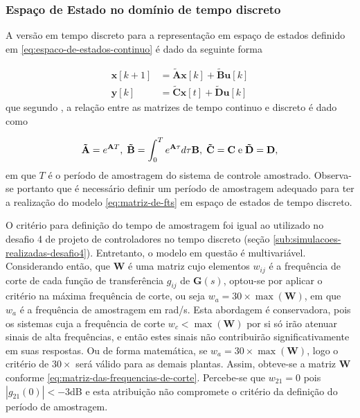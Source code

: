 \subsubsection{Espaço de Estado no domínio de tempo discreto}
\label{subsub:espaco-de-estados-no-dominio-de-tempo-discreto}

A versão em tempo discreto para a representação em espaço de estados definido em
\ref{eq:espaco-de-estados-continuo} é dado da seguinte forma

\begin{subequations}
    \label{eq:espaco-de-estados-discreto}
    \begin{align}
        \mathbf{x}[k+1] & = \mathbf{\tilde{A}}\mathbf{x}[k] + \mathbf{\tilde{B}}\mathbf{u}[k]
        \label{eq:estimativa-do-vetor-de-estados}                                             \\
        \mathbf{y}[k]   & = \mathbf{\tilde{C}}\mathbf{x}[t] + \mathbf{\tilde{D}}\mathbf{u}[k]
        \label{eq:saida-do-sistema-em-espaco-de-estados-discreto}
    \end{align}
\end{subequations} que segundo , a relação entre as
matrizes de tempo continuo e discreto é dado como

\begin{equation*}
    \mathbf{\tilde{A}} = e^{\mathbf{A}T},
    \thickspace
    \mathbf{\tilde{B}} = \int_{0}^{T}e^{\mathbf{A}\tau}d\tau \mathbf{B},
    \thickspace
    \mathbf{\tilde{C}} = \mathbf{C}
    \thickspace \text{e} \thickspace
    \mathbf{\tilde{D}} = \mathbf{D},
\end{equation*} em que $T$ é o período de amostragem do sistema de controle
amostrado. Observa-se portanto que é necessário definir um período de amostragem
adequado para ter a realização do modelo \ref{eq:matriz-de-fts} em espaço de
estados de tempo discreto.

O critério para definição do tempo de amostragem foi igual ao utilizado no
desafio 4 de projeto de controladores no tempo discreto (seção
\ref{sub:simulacoes-realizadas-desafio4}). Entretanto, o modelo em questão é
multivariável. Considerando então, que $\mathbf{W}$ é uma matriz cujo elementos
$w_{ij}$ é a frequência de corte de cada função de transferência $g_{ij}$ de
$\mathbf{G}(s)$, optou-se por aplicar o critério na máxima frequência de corte,
ou seja $w_a = 30\times\max(\mathbf{W})$, em que $w_a$ é a frequência de
amostragem em rad/s. Esta abordagem é conservadora, pois os sistemas cuja a
frequência de corte $w_c < \max(\mathbf{W})$ por si só irão atenuar sinais de
alta frequências, e então estes sinais não contribuirão significativamente em
suas respostas. Ou de forma matemática, se $w_a = 30\times\max(\mathbf{W})$,
logo o critério de $30\times$ será válido para as demais plantas. Assim,
obteve-se a matriz $\mathbf{W}$ conforme
\ref{eq:matriz-das-frequencias-de-corte}. Percebe-se que $w_{21} = 0$ pois
$|g_{21}(0)| < -3$dB e esta atribuição não compromete o critério da
definição do período de amostragem.


